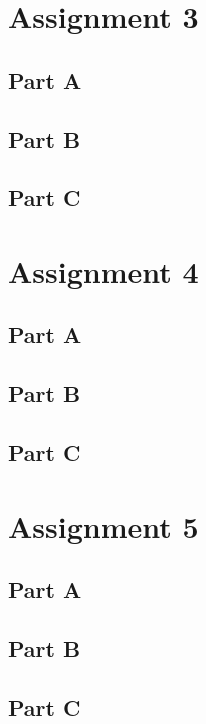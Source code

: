\documentclass[a4paper,10pt,titlepage]{report}
\begin{document}
\section{Assignment 3}

\subsection{Part A}

\subsection{Part B}

\subsection{Part C}

\section{Assignment 4}

\subsection{Part A}

\subsection{Part B}

\subsection{Part C}

\section{Assignment 5}

\subsection{Part A}

\subsection{Part B}

\subsection{Part C}
\end{document}
